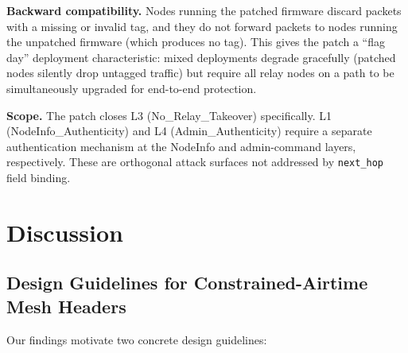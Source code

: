 \documentclass[journal]{IEEEtran}
\begin{document}
\textbf{Backward compatibility.}
Nodes running the patched firmware discard packets with a missing or
invalid tag, and they do not forward packets to nodes running the
unpatched firmware (which produces no tag). This gives the patch a
``flag day'' deployment characteristic: mixed deployments degrade
gracefully (patched nodes silently drop untagged traffic) but require
all relay nodes on a path to be simultaneously upgraded for end-to-end
protection.

\textbf{Scope.}
The patch closes L3 (No\_Relay\_Takeover) specifically. L1
(NodeInfo\_Authenticity) and L4 (Admin\_Authenticity) require
a separate authentication mechanism at the NodeInfo and admin-command
layers, respectively. These are orthogonal attack surfaces not
addressed by \texttt{next\_hop} field binding.

\section{Discussion}
\label{sec:discussion}

\subsection{Design Guidelines for Constrained-Airtime Mesh Headers}

Our findings motivate two concrete design guidelines:
\end{document}
